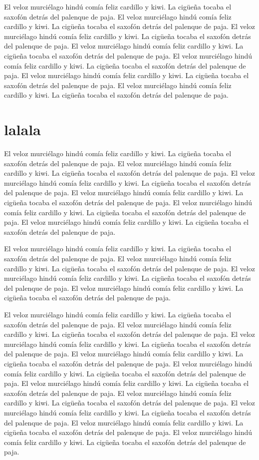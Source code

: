 \documentclass[a4paper,11pt,oneside]{report}
\begin{document}
El veloz murciélago hindú comía feliz cardillo y kiwi. La cigüeña tocaba el
saxofón detrás del palenque de paja.
El veloz murciélago hindú comía feliz cardillo y kiwi. La cigüeña tocaba el
saxofón detrás del palenque de paja.
El veloz murciélago hindú comía feliz cardillo y kiwi. La cigüeña tocaba el
saxofón detrás del palenque de paja.
El veloz murciélago hindú comía feliz cardillo y kiwi. La cigüeña tocaba el
saxofón detrás del palenque de paja.
El veloz murciélago hindú comía feliz cardillo y kiwi. La cigüeña tocaba el
saxofón detrás del palenque de paja.
El veloz murciélago hindú comía feliz cardillo y kiwi. La cigüeña tocaba el
saxofón detrás del palenque de paja.
El veloz murciélago hindú comía feliz cardillo y kiwi. La cigüeña tocaba el
saxofón detrás del palenque de paja.

\section{lalala}
El veloz murciélago hindú comía feliz cardillo y kiwi. La cigüeña tocaba el
saxofón detrás del palenque de paja.
El veloz murciélago hindú comía feliz cardillo y kiwi. La cigüeña tocaba el
saxofón detrás del palenque de paja.
El veloz murciélago hindú comía feliz cardillo y kiwi. La cigüeña tocaba el
saxofón detrás del palenque de paja.
El veloz murciélago hindú comía feliz cardillo y kiwi. La cigüeña tocaba el
saxofón detrás del palenque de paja.
El veloz murciélago hindú comía feliz cardillo y kiwi. La cigüeña tocaba el
saxofón detrás del palenque de paja.
El veloz murciélago hindú comía feliz cardillo y kiwi. La cigüeña tocaba el
saxofón detrás del palenque de paja.

El veloz murciélago hindú comía feliz cardillo y kiwi. La cigüeña tocaba el
saxofón detrás del palenque de paja.
El veloz murciélago hindú comía feliz cardillo y kiwi. La cigüeña tocaba el
saxofón detrás del palenque de paja.
El veloz murciélago hindú comía feliz cardillo y kiwi. La cigüeña tocaba el
saxofón detrás del palenque de paja.
El veloz murciélago hindú comía feliz cardillo y kiwi. La cigüeña tocaba el
saxofón detrás del palenque de paja.

El veloz murciélago hindú comía feliz cardillo y kiwi. La cigüeña tocaba el
saxofón detrás del palenque de paja.
El veloz murciélago hindú comía feliz cardillo y kiwi. La cigüeña tocaba el
saxofón detrás del palenque de paja.
El veloz murciélago hindú comía feliz cardillo y kiwi. La cigüeña tocaba el
saxofón detrás del palenque de paja.
El veloz murciélago hindú comía feliz cardillo y kiwi. La cigüeña tocaba el
saxofón detrás del palenque de paja.
El veloz murciélago hindú comía feliz cardillo y kiwi. La cigüeña tocaba el
saxofón detrás del palenque de paja.
El veloz murciélago hindú comía feliz cardillo y kiwi. La cigüeña tocaba el
saxofón detrás del palenque de paja.
El veloz murciélago hindú comía feliz cardillo y kiwi. La cigüeña tocaba el
saxofón detrás del palenque de paja.
El veloz murciélago hindú comía feliz cardillo y kiwi. La cigüeña tocaba el
saxofón detrás del palenque de paja.
El veloz murciélago hindú comía feliz cardillo y kiwi. La cigüeña tocaba el
saxofón detrás del palenque de paja.
El veloz murciélago hindú comía feliz cardillo y kiwi. La cigüeña tocaba el
saxofón detrás del palenque de paja.
\end{document}
